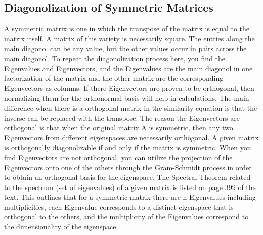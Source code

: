 \documentclass[12pt]{article}
\begin{document}
\subsection{Diagonolization of Symmetric Matrices}
A symmetric matrix is one in which the transpose of the matrix is equal to the matrix itself. A matrix of this variety is necessarily square. The entries along the main diagonol can be 
any value, but the other values occur in pairs across the main diagonol. To repeat the diagonolization process here, you find the Eigenvalues and Eigenvectors, and the Eigenvalues are 
the main diagonol in one factorization of the matrix and the other matrix are the corresponding Eigenvectors as columns. If there Eigenvectors are proven to be orthogonal, then normalizing 
them for the orthonormal basis will help in calculations. The main difference when there is a orthogonal matrix in the similarity equation is that the inverse can be replaced with the 
transpose. The reason the Eigenvectors are orthogonal is that when the original matrix A is symmetric, then any two Eigenvectors from different eigenspaces are necessarily orthogonal. 
A given matrix is orthogonally diagonolizable if and only if the matrix is symmetric. 
\newline
\newline
When you find Eigenvectors are not orthogonal, you can utilize the projection of the Eigenvectors onto one of the others through the Gram-Schmidt process in order to obtain an orthogonal 
basis for the eigenspace. The Spectral Theorem related to the spectrum (set of eigenvalues) of a given matrix is listed on page 399 of the text. This outlines that for a symmetric matrix 
there are n Eigenvalues including multiplicities, each Eigenvalue corresponds to a distinct eigenspace that is orthogonal to the others, and the multiplicity of the Eigenvalues 
correspond to the dimensionality of the eigenspace. 
\end{document}
